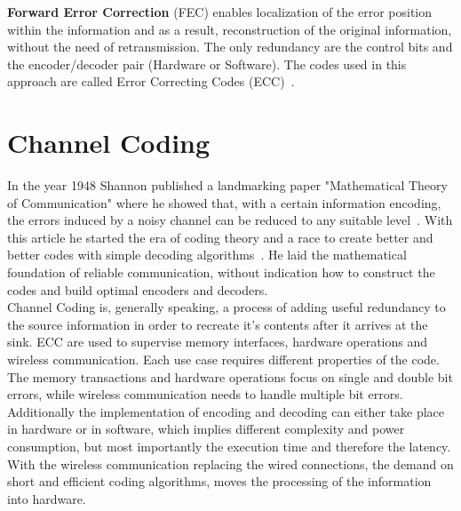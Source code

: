 \textbf{Forward Error Correction} (FEC) enables localization of the error position within the information and as a result, reconstruction of the original information, without the need of retransmission. The only redundancy are the control bits and the encoder/decoder pair (Hardware or Software). The codes used in this approach are called Error Correcting Codes (ECC)~\cite{book:SchonfeldKlimant}.

\section{Channel Coding} \label{sec:cod}
In the year 1948 Shannon published a landmarking paper "Mathematical Theory of Communication" where he showed that, with a certain information encoding, the errors induced by a noisy channel can be reduced to any suitable level~\cite{art:Shannon}. With this article he started the era of coding theory and a race to create better and better codes with simple decoding algorithms~\cite{book:Lint}. He laid the mathematical foundation of reliable communication, without indication how to construct the codes and build optimal encoders and decoders.\\

Channel Coding is, generally speaking, a process of adding useful redundancy to the source information in order to recreate it's contents after it arrives at the sink. ECC are used to supervise memory interfaces, hardware operations and wireless communication. Each use case requires different properties of the code. The memory transactions and hardware operations focus on single and double bit errors, while wireless communication needs to handle multiple bit errors. Additionally the implementation of encoding and decoding can either take place in hardware or in software, which implies different complexity and power consumption, but most importantly the execution time and therefore the latency. With the wireless communication replacing the wired connections, the demand on short and efficient coding algorithms, moves the processing of the information into hardware. 
